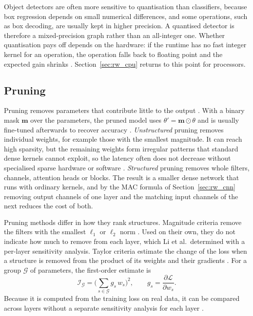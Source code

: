 \documentclass[a4paper,11pt,twoside]{report}
\theoremstyle{definition}
\begin{document}
Object detectors are often more sensitive to quantisation than classifiers, because box regression depends on small numerical differences, and some operations, such as box decoding, are usually kept in higher precision. A quantised detector is therefore a mixed-precision graph rather than an all-integer one. Whether quantisation pays off depends on the hardware: if the runtime has no fast integer kernel for an operation, the operation falls back to floating point and the expected gain shrinks \cite{Sze2017EfficientProcessing}. Section~\ref{sec:rw_cpu} returns to this point for processors.

\subsection{Pruning}
\label{sec:rw_pruning}

Pruning removes parameters that contribute little to the output \cite{Cheng2017SurveyCompression}. With a binary mask $\mathbf{m}$ over the parameters, the pruned model uses $\theta' = \mathbf{m} \odot \theta$ and is usually fine-tuned afterwards to recover accuracy \cite{Han2016DeepCompression}. \emph{Unstructured} pruning removes individual weights, for example those with the smallest magnitude. It can reach high sparsity, but the remaining weights form irregular patterns that standard dense kernels cannot exploit, so the latency often does not decrease without specialised sparse hardware or software \cite{Sze2017EfficientProcessing}. \emph{Structured} pruning removes whole filters, channels, attention heads or blocks. The result is a smaller dense network that runs with ordinary kernels, and by the MAC formula of Section~\ref{sec:rw_cnn} removing output channels of one layer and the matching input channels of the next reduces the cost of both.

Pruning methods differ in how they rank structures. Magnitude criteria remove the filters with the smallest $\ell_1$ or $\ell_2$ norm \cite{Li2017PruningFilters}. Used on their own, they do not indicate how much to remove from each layer, which Li et al.\ determined with a per-layer sensitivity analysis. Taylor criteria estimate the change of the loss when a structure is removed from the product of its weights and their gradients \cite{Molchanov2019Taylor}. For a group $\mathcal{G}$ of parameters, the first-order estimate is
\[
\mathcal{I}_{\mathcal{G}} = \Big(\sum_{s \in \mathcal{G}} g_s\, w_s\Big)^2,
\qquad g_s = \frac{\partial \mathcal{L}}{\partial w_s}.
\]
Because it is computed from the training loss on real data, it can be compared across layers without a separate sensitivity analysis for each layer \cite{Molchanov2019Taylor}.
\end{document}

